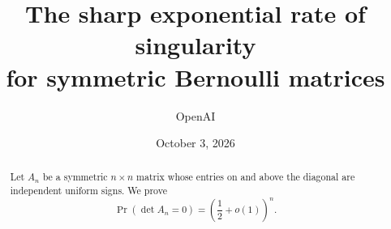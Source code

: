 \documentclass[11pt]{article}
\title{The sharp exponential rate of singularity\\
for symmetric Bernoulli matrices}
\author{OpenAI}
\date{October 3, 2026}
\numberwithin{equation}{section}
\theoremstyle{definition}
\theoremstyle{remark}
\begin{document}
\maketitle

\begin{abstract}
Let \(A_n\) be a symmetric \(n\times n\) matrix whose entries on and above
the diagonal are independent uniform signs. We prove
\[
 \Pr(\det A_n=0)=\left(\frac12+o(1)\right)^n.
\]
\end{abstract}

\tableofcontents
\clearpage













\end{document}
